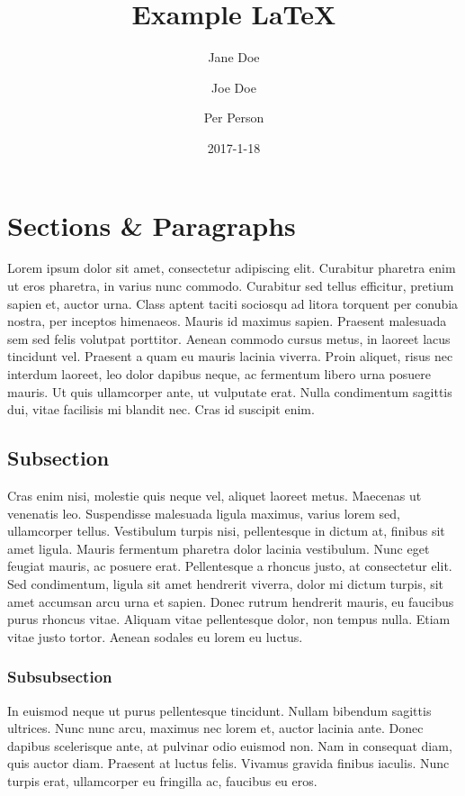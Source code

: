 \documentclass{article}
\title{Example LaTeX}
\author{Jane Doe \and Joe Doe \and Per Person}
\date{2017-1-18}
\begin{document}
\maketitle

\section{Sections \& Paragraphs}

Lorem ipsum dolor sit amet, consectetur adipiscing elit. Curabitur
pharetra enim ut eros pharetra, in varius nunc commodo. Curabitur sed
tellus efficitur, pretium sapien et, auctor urna. Class aptent taciti
sociosqu ad litora torquent per conubia nostra, per inceptos himenaeos.
Mauris id maximus sapien. Praesent malesuada sem sed felis volutpat
porttitor. Aenean commodo cursus metus, in laoreet lacus tincidunt vel.
Praesent a quam eu mauris lacinia viverra. Proin aliquet, risus nec
interdum laoreet, leo dolor dapibus neque, ac fermentum libero urna
posuere mauris. Ut quis ullamcorper ante, ut vulputate erat. Nulla
condimentum sagittis dui, vitae facilisis mi blandit nec. Cras id
suscipit enim.

\subsection{Subsection}

Cras enim nisi, molestie quis neque vel, aliquet laoreet metus. Maecenas
ut venenatis leo. Suspendisse malesuada ligula maximus, varius lorem
sed, ullamcorper tellus. Vestibulum turpis nisi, pellentesque in dictum
at, finibus sit amet ligula. Mauris fermentum pharetra dolor lacinia
vestibulum. Nunc eget feugiat mauris, ac posuere erat. Pellentesque a
rhoncus justo, at consectetur elit. Sed condimentum, ligula sit amet
hendrerit viverra, dolor mi dictum turpis, sit amet accumsan arcu urna
et sapien. Donec rutrum hendrerit mauris, eu faucibus purus rhoncus
vitae. Aliquam vitae pellentesque dolor, non tempus nulla. Etiam vitae
justo tortor. Aenean sodales eu lorem eu luctus.

\subsubsection{Subsubsection}

In euismod neque ut purus pellentesque tincidunt. Nullam bibendum
sagittis ultrices. Nunc nunc arcu, maximus nec lorem et, auctor lacinia
ante. Donec dapibus scelerisque ante, at pulvinar odio euismod non. Nam
in consequat diam, quis auctor diam. Praesent at luctus felis. Vivamus
gravida finibus iaculis. Nunc turpis erat, ullamcorper eu fringilla ac,
faucibus eu eros.
\end{document}
